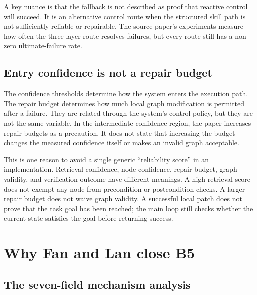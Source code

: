 A key nuance is that the fallback is not described as proof that reactive control will succeed. It is an alternative control route when the structured skill path is not sufficiently reliable or repairable. The source paper's experiments measure how often the three-layer route resolves failures, but every route still has a non-zero ultimate-failure rate.\autocite{xia2026grasp}


\subsection{Entry confidence is not a repair budget}

The confidence thresholds determine how the system enters the execution path. The repair budget determines how much local graph modification is permitted after a failure. They are related through the system's control policy, but they are not the same variable. In the intermediate confidence region, the paper increases repair budgets as a precaution. It does not state that increasing the budget changes the measured confidence itself or makes an invalid graph acceptable.

This is one reason to avoid a single generic “reliability score” in an implementation. Retrieval confidence, node confidence, repair budget, graph validity, and verification outcome have different meanings. A high retrieval score does not exempt any node from precondition or postcondition checks. A larger repair budget does not waive graph validity. A successful local patch does not prove that the task goal has been reached; the main loop still checks whether the current state satisfies the goal before returning success.\autocite{xia2026grasp}

\section{Why Fan and Lan close B5}
\label{sec:ch17-why-b5-closes}

\subsection{The seven-field mechanism analysis}

